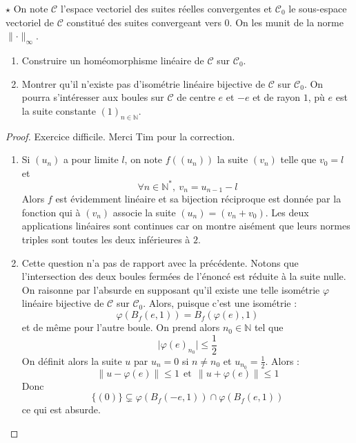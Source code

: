 \documentclass[french,a4paper]{article}
\newcommand{\N}{\mathbb{N}}
\newcommand{\st}{^*}
\theoremstyle{plain}
\theoremstyle{definition}
\theoremstyle{remark}
\begin{document}
\begin{ex}{$\star$}
	On note $\mathcal{C}$ l'espace vectoriel des suites réelles convergentes et $\mathcal{C}_0$ le sous-espace vectoriel de $\mathcal{C}$ constitué des suites convergeant vers $0$. On les munit de la norme $\lVert\cdot\rVert_\infty$.
	\begin{enumerate}
		\item Construire un homéomorphisme linéaire de $\mathcal{C}$ sur $\mathcal{C}_0$.
		\item Montrer qu'il n'existe pas d'isométrie linéaire bijective de $\mathcal{C}$ sur $\mathcal{C}_0$. On pourra s'intéresser aux boules sur $\mathcal{C}$ de centre $e$ et $-e$ et de rayon $1$, pù $e$ est la suite constante $(1)_{n\in\N}$.		
	\end{enumerate}
\end{ex}
\begin{proof}
	Exercice difficile. Merci Tim pour la correction.
	\begin{enumerate}
		\item Si $(u_n)$ a pour limite $l$, on note $f((u_n))$ la suite $(v_n)$ telle que $v_0=l$ et $$\forall n\in\N\st,\ v_{n}=u_{n-1}-l$$ Alors $f$ est évidemment linéaire et sa bijection réciproque est donnée par la fonction qui à $(v_n)$ associe la suite $(u_n)=(v_n+v_0)$. Les deux applications linéaires sont continues car on montre aisément que leurs normes triples sont toutes les deux inférieures à $2$.
		\item Cette question n'a pas de rapport avec la précédente. Notons que l'intersection des deux boules fermées de l'énoncé est réduite à la suite nulle. On raisonne par l'absurde en supposant qu'il existe une telle isométrie $\varphi$ linéaire bijective de $\mathcal{C}$ sur $\mathcal{C}_0$. Alors, puisque c'est une isométrie : $$\varphi\left(B_f(e,1)\right)=B_f(\varphi(e),1)$$ et de même pour l'autre boule. On prend alors $n_0\in\N$ tel que $$\lvert\varphi(e)_{n_0}\rvert\leqslant\frac{1}{2}$$ On définit alors la suite $u$ par $u_n=0$ si $n\ne n_0$ et $u_{n_0}=\displaystyle\frac{1}{2}$. Alors : $$\lVert u-\varphi(e)\rVert\leqslant 1\ \ \text{et} \ \ \lVert u+\varphi(e)\rVert\leqslant 1$$ Donc $$\{(0)\}\subsetneq \varphi\left(B_f(-e,1)\right)\cap \varphi\left(B_f(e,1)\right)$$ ce qui est absurde.
	\end{enumerate}
\end{proof}
\end{document}
